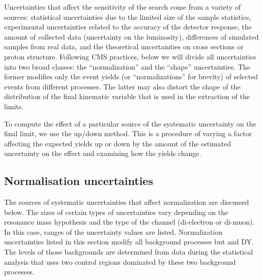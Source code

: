Uncertainties that affect the sensitivity of the search come from a variety of sources: statistical uncertainties due to the limited size of the sample statistics, experimental uncertainties related to the accuracy of the detector response, the amount of collected data (uncertainty on the luminosity), differences of simulated samples from real data, and the theoretical uncertainties on cross sections or proton structure. Following CMS practices, below we will divide all uncertainties into two broad classes: the ``normalization'' and the ``shape'' uncertainties. The former modifies only the event yields (or ``normalizations'' for brevity) of selected events from different processes. The latter may also distort the shape of the distribution of the final kinematic variable that is used in the extraction of the limits.

To compute the effect of a particular source of the systematic uncertainty on the final limit, we use the up/down method. This is a procedure of varying a factor affecting the expected yields up or down by the amount of the estimated uncertainty on the effect and examining how the yields change.

\subsection{Normalisation uncertainties}

The sources of systematic uncertainties that affect normalization are discussed below. The sizes of certain types of uncertainties vary depending on the resonance mass hypothesis and the type of the channel (di-electron or di-muon). In this case, ranges of the uncertainty values are listed. Normalization uncertainties listed in this section modify all background processes but \ttbar and DY. The levels of those backgrounds are determined from data during the statistical analysis that uses two control regions dominated by these two background processes.

